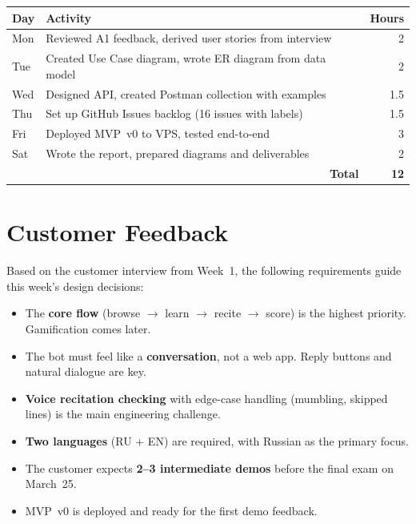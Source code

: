\documentclass[11pt, a4paper]{article}
\begin{document}
\begin{center}
\begin{tabular}{|l|l|r|}
\hline
\textbf{Day} & \textbf{Activity} & \textbf{Hours} \\
\hline
Mon & Reviewed A1 feedback, derived user stories from interview & 2 \\
\hline
Tue & Created Use Case diagram, wrote ER diagram from data model & 2 \\
\hline
Wed & Designed API, created Postman collection with examples & 1.5 \\
\hline
Thu & Set up GitHub Issues backlog (16 issues with labels) & 1.5 \\
\hline
Fri & Deployed MVP~v0 to VPS, tested end-to-end & 3 \\
\hline
Sat & Wrote the report, prepared diagrams and deliverables & 2 \\
\hline
\multicolumn{2}{|r|}{\textbf{Total}} & \textbf{12} \\
\hline
\end{tabular}
\end{center}


\section{Customer Feedback}

Based on the customer interview from Week~1, the following requirements guide this week's design decisions:

\begin{itemize}
    \item The \textbf{core flow} (browse $\rightarrow$ learn $\rightarrow$ recite $\rightarrow$ score) is the highest priority. Gamification comes later.
    \item The bot must feel like a \textbf{conversation}, not a web app. Reply buttons and natural dialogue are key.
    \item \textbf{Voice recitation checking} with edge-case handling (mumbling, skipped lines) is the main engineering challenge.
    \item \textbf{Two languages} (RU + EN) are required, with Russian as the primary focus.
    \item The customer expects \textbf{2--3 intermediate demos} before the final exam on March~25.
    \item MVP~v0 is deployed and ready for the first demo feedback.
\end{itemize}
\end{document}
